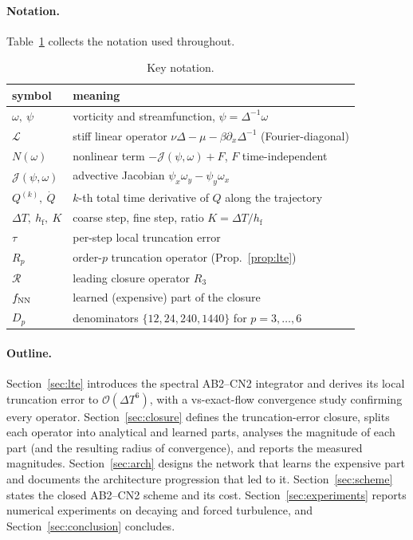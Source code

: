 \documentclass[11pt]{article}
\theoremstyle{plain}
\theoremstyle{definition}
\newcommand{\Lop}{\mathcal{L}}
\newcommand{\Jop}{\mathcal{J}}
\newcommand{\Rop}{\mathcal{R}}
\newcommand{\bO}{\mathcal{O}}
\newcommand{\DT}{\Delta T}
\newcommand{\hf}{h_{\mathrm{f}}}
\begin{document}
\paragraph{Notation.}
Table~\ref{tab:notation} collects the notation used throughout.
\begin{table}[h]
\centering\small
\caption{Key notation.}
\label{tab:notation}
\begin{tabular}{ll}
\toprule
symbol & meaning \\
\midrule
$\omega,\ \psi$        & vorticity and streamfunction, $\psi=\Delta^{-1}\omega$ \\
$\Lop$                 & stiff linear operator $\nu\Delta-\mu-\beta\partial_x\Delta^{-1}$ (Fourier-diagonal) \\
$N(\omega)$            & nonlinear term $-\Jop(\psi,\omega)+F$, $F$ time-independent \\
$\Jop(\psi,\omega)$    & advective Jacobian $\psi_x\omega_y-\psi_y\omega_x$ \\
$Q^{(k)},\ \dot Q$     & $k$-th total time derivative of $Q$ along the trajectory \\
$\DT,\ \hf,\ K$        & coarse step, fine step, ratio $K=\DT/\hf$ \\
$\tau$                 & per-step local truncation error \\
$R_p$                  & order-$p$ truncation operator (Prop.~\ref{prop:lte}) \\
$\Rop$                 & leading closure operator $R_3$ \\
$f_{\rm NN}$           & learned (expensive) part of the closure \\
$D_p$                  & denominators $\{12,24,240,1440\}$ for $p=3,\dots,6$ \\
\bottomrule
\end{tabular}
\end{table}

\paragraph{Outline.}
Section~\ref{sec:lte} introduces the spectral AB2--CN2 integrator and derives
its local truncation error to $\bO(\DT^6)$, with a vs-exact-flow convergence
study confirming every operator. Section~\ref{sec:closure} defines the
truncation-error closure, splits each operator into analytical and learned
parts, analyses the magnitude of each part (and the resulting radius of
convergence), and reports the measured magnitudes. Section~\ref{sec:arch}
designs the network that learns the expensive part and documents the
architecture progression that led to it. Section~\ref{sec:scheme} states the
closed AB2--CN2 scheme and its cost. Section~\ref{sec:experiments} reports
numerical experiments on decaying and forced turbulence, and
Section~\ref{sec:conclusion} concludes.
\end{document}
